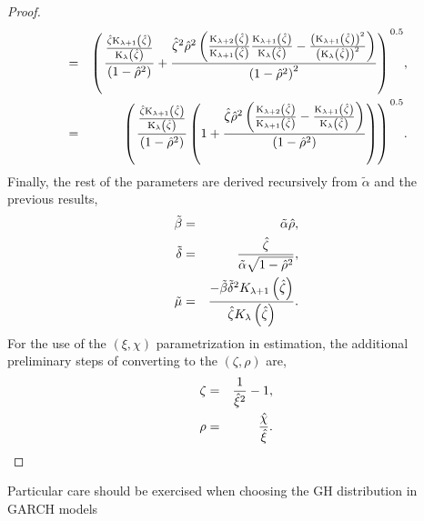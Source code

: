 \begin{proof}
\begin{eqnarray}
   & = & {\left( {\left. {\frac{{\frac{{\hat \zeta {{\text{K}}_{\lambda  + 1}}\left( {\hat \zeta } \right)}}{{{{\text{K}}_\lambda }\left( {\hat \zeta } \right)}}}}{{(1 - {{\hat \rho }^2})}} + \frac{{{\hat \zeta ^2}{\hat \rho ^2}\left( {\frac{{{{\text{K}}_{\lambda  + 2}}\left( {\hat \zeta } \right)}}{{{{\text{K}}_{\lambda  + 1}}\left( {\hat \zeta } \right)}}\frac{{{{\text{K}}_{\lambda  + 1}}\left( {\hat \zeta } \right)}}{{{{\text{K}}_\lambda }\left( {\hat \zeta } \right)}} - \frac{{{{\left( {{{\text{K}}_{\lambda  + 1}}\left( {\hat \zeta } \right)} \right)}^2}}}{{{{\left( {{{\text{K}}_\lambda }\left( {\hat \zeta } \right)} \right)}^2}}}} \right)}}{{{{\left( {1 - {{\hat \rho }^2}} \right)}^2}}}} \right)} \right.^{0.5}}, \hfill\nonumber \\
   & = & {\left( {\left. {\frac{{\frac{{\hat \zeta {{\text{K}}_{\lambda  + 1}}\left( {\hat \zeta } \right)}}{{{{\text{K}}_\lambda }\left( {\hat \zeta } \right)}}}}{{(1 - {{\hat \rho }^2})}}\left(1 + \frac{{\hat \zeta {{\hat \rho }^2}\left( {\frac{{{{\text{K}}_{\lambda  + 2}}\left( {\hat \zeta } \right)}}{{{{\text{K}}_{\lambda  + 1}}\left( {\hat \zeta } \right)}} - \frac{{{{\text{K}}_{\lambda  + 1}}\left( {\hat \zeta } \right)}}{{{{\text{K}}_\lambda }\left( {\hat \zeta } \right)}}} \right)}}{{\left( {1 - {{\hat \rho }^2}} \right)}}\right)} \right)} \right.^{0.5}}. \hfill\label{sgh51}
\end{eqnarray}
Finally, the rest of the parameters are derived recursively from $\tilde\alpha$
and the previous results,
\begin{eqnarray}
  \tilde \beta  & = & \tilde \alpha \hat \rho,\hfill\label{sgh52}\\
  \tilde \delta & = & \frac{{\hat \zeta }}{{\tilde \alpha \sqrt {1 - {{\hat \rho }^2}} }}, \hfill\label{sgh53}\\
  \tilde \mu & = & \frac{{ - \tilde \beta {{\tilde \delta }^2}{K_{\lambda  + 1}}\left(\hat \zeta \right)}}{{\hat \zeta {K_\lambda }\left(\hat \zeta \right)}}.\hfill\label{sgh54}
\end{eqnarray}
For the use of the $(\xi, \chi)$ parametrization in estimation, the additional
preliminary steps of converting to the $(\zeta, \rho)$ are,
\begin{eqnarray}
  \zeta  & = & \frac{1}{{{{\hat \xi }^2}}} - 1, \hfill\label{sgh62}\\
  \rho  & = & \frac{{\hat \chi }}{{\hat \xi }}. \hfill\label{sgh63}
\end{eqnarray}
\end{proof}
Particular care should be exercised when choosing the GH distribution in GARCH models
